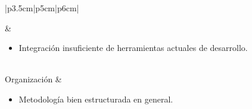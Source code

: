 \documentclass[12pt]{article}
\begin{document}
\begin{longtable}{|p{3.5cm}|p{5cm}|p{6cm}|}
\begin{minipage}[H]{1.0\linewidth}
\begin{itemize}[leftmargin=8pt]
                                 \end{itemize}
                                \vspace{1pt}
                               \end{minipage} & \begin{minipage}[H]{1.0\linewidth}
                                 \begin{itemize}[leftmargin=8pt]
                                 \item Integración insuficiente de herramientas actuales de desarrollo.
                                 \end{itemize}
                               \end{minipage} \\ \hline 
    Organización & \begin{minipage}[H]{1.0\linewidth}
                                 \begin{itemize}[leftmargin=8pt]
                                 \item Metodología bien estructurada en general.


\end{itemize}
\end{minipage}
\end{longtable}
\end{document}
